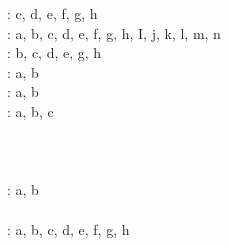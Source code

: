 \documentclass[12pt]{article}
\begin{document}
: c, d, e, f, g, h \\


: a, b, c, d, e, f, g, h, I, j, k, l, m, n \\


: b, c, d, e, g, h \\


: a, b \\


: a, b \\


: a, b, c \\


 \\


 \\

 \\

: a, b \\

 \\

: a, b, c, d, e, f, g, h \\

 \\

 \\
\end{document}
